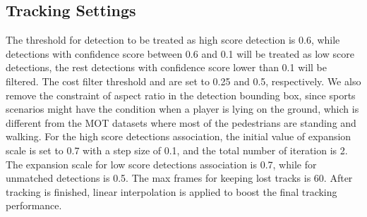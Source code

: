 \documentclass[10pt,twocolumn,letterpaper]{article}
\begin{document}
\subsection{Tracking Settings}
The threshold for detection to be treated as high score detection is 0.6, while detections with confidence score between 0.6 and 0.1 will be treated as low score detections, the rest detections with confidence score lower than 0.1 will be filtered. The cost filter threshold  and  are set to 0.25 and 0.5, respectively. We also remove the constraint of aspect ratio in the detection bounding box, since sports scenarios might have the condition when a player is lying on the ground, which is different from the MOT datasets where most of the pedestrians are standing and walking. For the high score detections association, the initial value of expansion scale  is set to 0.7 with a step size  of 0.1, and the total number of iteration  is 2. The expansion scale  for low score detections association is 0.7, while for unmatched detections is 0.5. The max frames for keeping lost tracks is 60. After tracking is finished, linear interpolation is applied to boost the final tracking performance.
\end{document}
